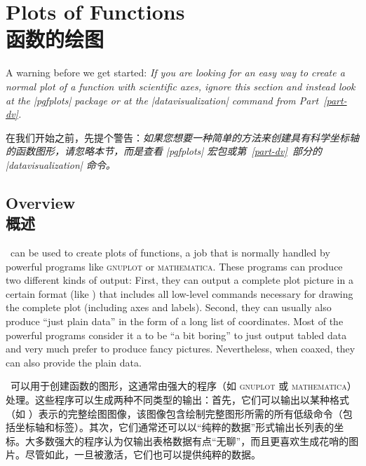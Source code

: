 \setcounter{section}{21}
\setcounter{subsection}{6}
\setcounter{subsubsection}{0}
%
%
%


\section{Plots of Functions\\函数的绘图}
\label{section-tikz-plots}

A warning before we get started: \emph{If you are looking for an easy way to
create a normal plot of a function with scientific axes, ignore this section
and instead look at the |pgfplots| package or at the |datavisualization|
command from Part~\ref{part-dv}.}

在我们开始之前，先提个警告：\emph{如果您想要一种简单的方法来创建具有科学坐标轴的函数图形，请忽略本节，而是查看 |pgfplots| 宏包或第~\ref{part-dv}~部分的 |datavisualization| 命令。}

\subsection{Overview\\概述}
\label{section-why-pgname-for-plots}

\tikzname\ can be used to create plots of functions, a job that is normally
handled by powerful programs like \textsc{gnuplot} or \textsc{mathematica}.
These programs can produce two different kinds of output: First, they can
output a complete plot picture in a certain format (like \pdf) that includes
all low-level commands necessary for drawing the complete plot (including axes
and labels). Second, they can usually also produce ``just plain data'' in the
form of a long list of coordinates. Most of the powerful programs consider it a
to be ``a bit boring'' to just output tabled data and very much prefer to
produce fancy pictures. Nevertheless, when coaxed, they can also provide the
plain data.

\tikzname\ 可以用于创建函数的图形，这通常由强大的程序（如 \textsc{gnuplot} 或 \textsc{mathematica}）处理。这些程序可以生成两种不同类型的输出：首先，它们可以输出以某种格式（如 \pdf）表示的完整绘图图像，该图像包含绘制完整图形所需的所有低级命令（包括坐标轴和标签）。其次，它们通常还可以以“纯粹的数据”形式输出长列表的坐标。大多数强大的程序认为仅输出表格数据有点“无聊”，而且更喜欢生成花哨的图片。尽管如此，一旦被激活，它们也可以提供纯粹的数据。

